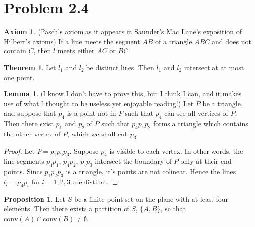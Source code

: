 \documentclass[12pt]{article}
\newcommand{\conv}[1]{\mbox{conv}(#1)}
\theoremstyle{definition}
\newtheorem{lemma}{Lemma}
\newtheorem{theorem}{Theorem}
\newtheorem{proposition}{Proposition}
\newtheorem{axiom}{Axiom}
\begin{document}
\section{Problem 2.4}

\begin{axiom}(Pasch's axiom as it appears in Saunder's Mac Lane's exposition of Hilbert's axioms) If a line meets the segment $AB$ of a triangle $ABC$ and does not contain $C$, then $l$ meets either $AC$ or $BC$. 
\end{axiom}

\begin{theorem}
Let $l_1$ and $l_2$ be distinct lines. Then $l_1$ and $l_2$ intersect at at most one point. 
\end{theorem}

\begin{lemma} (I know I don't have to prove this, but I think I can, and it makes use of what I thought to be useless yet enjoyable reading!) Let $P$ be a triangle, and suppose that $p_4$ is a point not in $P$ such that $p_4$ can see all vertices of $P$. Then there exist $p_1$ and $p_2$ of $P$ such that $p_4p_1p_2$ forms a triangle which contains the other vertex of $P$, which we shall call $p_3$.
\end{lemma}

\begin{proof}
Let $P = p_1p_2p_3$. Suppose $p_4$ is visible to each vertex. In other words, the line segments $p_4p_1$, $p_4p_2$, $p_4p_3$ intersect the boundary of $P$ only at their end-points. Since $p_1p_2p_3$ is a triangle, it's points are not colinear. Hence the lines $l_i = p_4p_i$ for $i = 1,2,3$ are distinct. 
\end{proof}

\begin{proposition}
Let $S$ be a finite point-set on the plane with at least four elements. Then there exists a partition of $S$, $\{A,B\}$, so that $\conv{A}\cap \conv{B} \ne \emptyset$.
\end{proposition}
\end{document}
